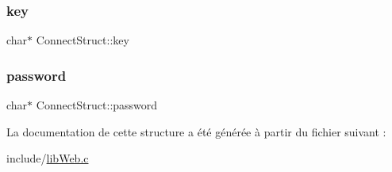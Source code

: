 \subsubsection{\texorpdfstring{key}{key}}
{\footnotesize\ttfamily char$\ast$ Connect\+Struct\+::key}

\mbox{\label{struct_connect_struct_a2cb458ca9913b6c6b0cfe6ad693d2c7a}} 
\subsubsection{\texorpdfstring{password}{password}}
{\footnotesize\ttfamily char$\ast$ Connect\+Struct\+::password}



La documentation de cette structure a été générée à partir du fichier suivant \+:\begin{DoxyCompactItemize}
\item 
include/\hyperlink{lib_web_8c}{lib\+Web.\+c}\end{DoxyCompactItemize}

